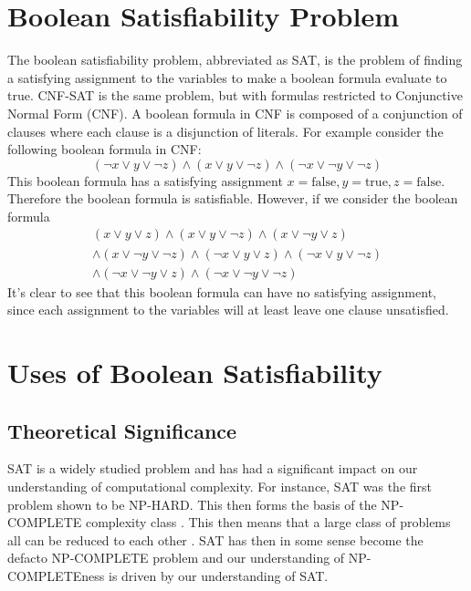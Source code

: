 \section{Boolean Satisfiability Problem} %
The boolean satisfiability problem, abbreviated as SAT, is the problem of finding
a satisfying assignment to the variables to make a boolean formula evaluate to true.
CNF-SAT is the same problem, but with formulas restricted to Conjunctive Normal Form
(CNF). A boolean formula in CNF is composed of a conjunction of clauses where
each clause is a disjunction of literals. For example consider the following
boolean formula in CNF: 
\begin{equation} \label{eq:formula_sat}
    (\neg x \lor y \lor \neg z) \land (x \lor y \lor \neg z) \land (\neg x \lor \neg y \lor \neg z)
\end{equation}
This boolean formula has
a satisfying assignment $x = \text{false}, y = \text{true}, z = \text{false}$. Therefore the boolean formula is satisfiable.
However, if we consider the boolean formula
\begin{align}
(x \lor y \lor z)\land(x \lor y \lor \neg z)\land(x \lor \neg y \lor z) \nonumber\\
\land(x \lor \neg y \lor \neg z)\land(\neg x \lor y \lor z)\land(\neg x \lor y \lor \neg z) \\
\land(\neg x \lor \neg y \lor z)\land(\neg x \lor \neg y \lor \neg z) \nonumber
\end{align}
It's clear to see that this boolean formula can have no
satisfying assignment, since each assignment to the variables
will at least leave one clause unsatisfied.

\section{Uses of Boolean Satisfiability} %
\subsection{Theoretical Significance}
SAT is a widely studied problem and has had a significant impact on
our understanding of computational complexity. For instance, SAT
was the first problem shown to be NP-HARD.
This then forms the basis of the NP-COMPLETE complexity class \cite{cook1971complexity, karp1972reducibility}.
This then means that a large class of problems all can be reduced to each other \cite{garey1974some}.
SAT has then in some sense become the defacto NP-COMPLETE problem and
our understanding of NP-COMPLETEness is driven by our understanding of SAT.


